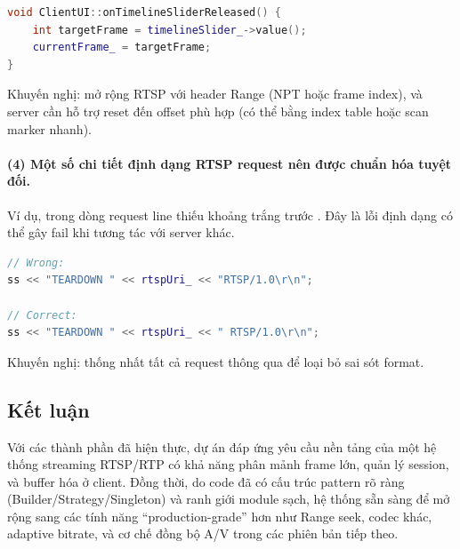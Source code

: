 \begin{lstlisting}[language=C++, caption={Seek hiện tại chỉ cập nhật currentFrame\_ ở UI}, label={lst:seek_ui_only}]
void ClientUI::onTimelineSliderReleased() {
    int targetFrame = timelineSlider_->value();
    currentFrame_ = targetFrame;
}
\end{lstlisting}

Khuyến nghị: mở rộng RTSP với header Range (NPT hoặc frame index), và server cần hỗ trợ reset  đến offset phù hợp (có thể bằng index table hoặc scan marker nhanh).

\paragraph{(4) Một số chi tiết định dạng RTSP request nên được chuẩn hóa tuyệt đối.}
Ví dụ, trong  dòng request line thiếu khoảng trắng trước . Đây là lỗi định dạng có thể gây fail khi tương tác với server khác.

\begin{lstlisting}[language=C++, caption={Teardown request line thiếu khoảng trắng trước phiên bản}, label={lst:teardown_spacing}]
// Wrong:
ss << "TEARDOWN " << rtspUri_ << "RTSP/1.0\r\n";

// Correct:
ss << "TEARDOWN " << rtspUri_ << " RTSP/1.0\r\n";
\end{lstlisting}

Khuyến nghị: thống nhất tất cả request thông qua  để loại bỏ sai sót format.

\subsection{Kết luận}

Với các thành phần đã hiện thực, dự án đáp ứng yêu cầu nền tảng của một hệ thống streaming RTSP/RTP có khả năng phân mảnh frame lớn, quản lý session, và buffer hóa ở client. Đồng thời, do code đã có cấu trúc pattern rõ ràng (Builder/Strategy/Singleton) và ranh giới module sạch, hệ thống sẵn sàng để mở rộng sang các tính năng ``production-grade'' hơn như Range seek, codec khác, adaptive bitrate, và cơ chế đồng bộ A/V trong các phiên bản tiếp theo.
